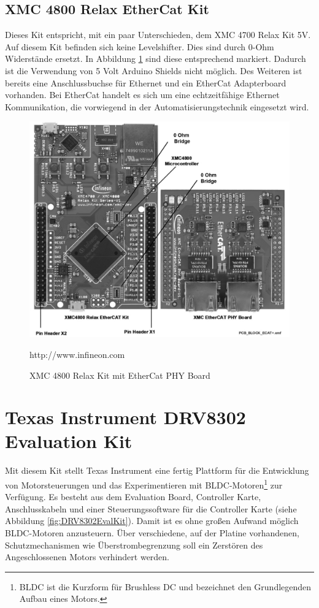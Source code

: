 

\subsection{XMC 4800 Relax EtherCat Kit}
\label{sec:XMC4800}
Dieses Kit entspricht, mit ein paar Unterschieden, dem XMC 4700 Relax Kit 5V.
Auf diesem Kit befinden sich keine Levelshifter.
Dies sind durch 0-Ohm Widerstände ersetzt.
In Abbildung \ref{fig:XMC4800} sind diese entsprechend markiert.
Dadurch ist die Verwendung von 5 Volt Arduino Shields nicht möglich.
Des Weiteren ist bereits eine Anschlussbuchse für Ethernet und ein EtherCat Adapterboard vorhanden.
Bei EtherCat handelt es sich um eine echtzeitfähige Ethernet Kommunikation, die vorwiegend in der Automatisierungstechnik eingesetzt wird. 

\begin{figure}[hptb]
	\centering
	\includegraphics[width=\textwidth-4cm]{hardware/graphics/XMC_4800_Board_with_EtherCAT}
	\caption{XMC 4800 Relax Kit mit EtherCat PHY Board}
	\quelle http://www.infineon.com
	\label{fig:XMC4800}
\end{figure}


\newpage
\section{Texas Instrument DRV8302 Evaluation Kit}	
\label{sec:TI DRV8302 EvalKit}
Mit diesem Kit stellt Texas Instrument eine fertig Plattform für die Entwicklung von Motorsteuerungen und das Experimentieren mit BLDC-Motoren\footnote{BLDC ist die Kurzform für Brushless DC und bezeichnet den Grundlegenden Aufbau eines Motors.} zur Verfügung.
Es besteht aus dem Evaluation Board, Controller Karte, Anschlusskabeln und einer Steuerungssoftware für die Controller Karte (siehe Abbildung \ref{fig:DRV8302EvalKit}).
Damit ist es ohne großen Aufwand möglich BLDC-Motoren anzusteuern.
Über verschiedene, auf der Platine vorhandenen, Schutzmechanismen wie Überstrombegrenzung soll ein Zerstören des Angeschlossenen Motors verhindert werden.

